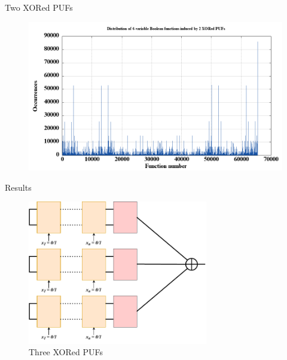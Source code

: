 \documentclass[10pt, compress]{beamer}
\begin{document}
\begin{frame}{Two XORed PUFs}
    \begin{figure}
        \centering
        \includegraphics[width=\textwidth]{figures/dist/distribution_of_4-variable_boolean_functions_induced_by_2_xored_pufs.png}
    \end{figure}
\end{frame}


\begin{frame}{Results}
    \begin{figure}
        \centering
        \includegraphics[width=0.7\textwidth]{figures/puf_3_xor.pdf}
        \caption{Three XORed PUFs}
    \end{figure}
\end{frame}
\end{document}
